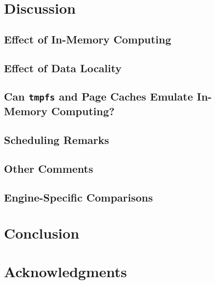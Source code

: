 \documentclass{IEEEtran}
\begin{document}

\section{Discussion} %

\subsection{Effect of In-Memory Computing}

\subsection{Effect of Data Locality}


\subsection{Can \texttt{tmpfs} and Page Caches Emulate In-Memory Computing?}


\subsection{Scheduling Remarks}

\subsection{Other Comments}


\subsection{Engine-Specific Comparisons}


\section{Conclusion} %



\section{Acknowledgments}


 

\end{document}
